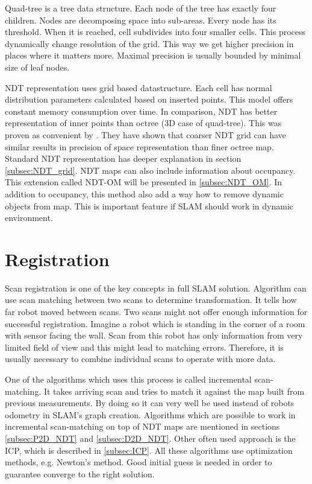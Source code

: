 Quad-tree is a tree data structure. Each node of the tree has exactly four children. Nodes are decomposing space into sub-areas. Every node has its threshold. When it is reached, cell subdivides into four smaller cells. This process dynamically change resolution of the grid. This way we get higher precision in places where it matters more. Maximal precision is usually bounded by minimal size of leaf nodes.

\gls{NDT} representation uses grid based datastructure. Each cell has normal distribution parameters calculated based on inserted points. This model offers constant memory consumption over time. In comparison, \gls{NDT} has better representation of inner points than octree (3D case of quad-tree). This was proven as convenient by \cite{Saarinen13}. They have shown that coarser \gls{NDT} grid can have similar results in precision of space representation than finer octree map. Standard \gls{NDT} representation has deeper explanation in section \ref{subsec:NDT_grid}. \gls{NDT} maps can also include information about occupancy. This extension called \gls{NDT-OM} will be presented in \ref{subsec:NDT_OM}. In addition to occupancy, this method also add a way how to remove dynamic objects from map. This is important feature if \gls{SLAM} should work in dynamic environment.      
\newpage

\section{Registration}
\label{Scan_reg}
Scan registration is one of the key concepts in full SLAM solution. Algorithm can use scan matching between two scans to determine transformation. It tells how far robot moved between scans. Two scans might not offer enough information for successful registration. Imagine a robot which is standing in the corner of a room with sensor facing the wall. Scan from this robot has only information from very limited field of view and this might lead to matching errors. Therefore, it is usually necessary to combine individual scans to operate with more data.  

One of the algorithms which uses this process is called incremental scan-matching. It takes arriving scan and tries to match it against the map built from previous measurements. By doing so it can very well be used instead of robots odometry in \gls{SLAM}'s graph creation. Algorithms which are possible to work in incremental scan-matching on top of \gls{NDT} maps are mentioned in sections \ref{subsec:P2D_NDT} and \ref{subsec:D2D_NDT}. Other often used approach is the \gls{ICP}, which is described in \ref{subsec:ICP}. All these algorithms use optimization methods, e.g. Newton's method. Good initial guess is needed in order to guarantee converge to the right solution. 

